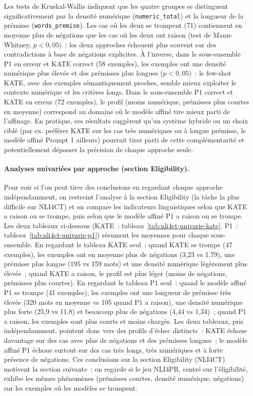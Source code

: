 \documentclass[10pt,twoside]{article}
\begin{document}
Les tests de Kruskal-Wallis indiquent que les quatre groupes se distinguent significativement par la densité numérique (\texttt{numeric\_total}) et la longueur de la prémisse (\texttt{words\_premise}). Les cas où les deux se trompent (71) contiennent en moyenne plus de négations que les cas où les deux ont raison (test de Mann-Whitney, $p < 0{,}05$)~: les deux approches échouent plus souvent sur des contradictions à base de négations explicites. À l'inverse, dans le sous-ensemble P1 en erreur et KATE correct (58 exemples), les exemples ont une densité numérique plus élevée et des prémisses plus longues ($p < 0{,}05$)~: le few-shot KATE, avec des exemples sémantiquement proches, semble mieux exploiter le contexte numérique et les critères longs. Dans le sous-ensemble P1 correct et KATE en erreur (72 exemples), le profil (moins numérique, prémisses plus courtes en moyenne) correspond au domaine où le modèle affiné tire mieux parti de l'affinage. En pratique, ces résultats suggèrent qu'un système hybride ou un choix ciblé (par ex. préférer KATE sur les cas très numériques ou à longue prémisse, le modèle affiné Prompt 1 ailleurs) pourrait tirer parti de cette complémentarité et potentiellement dépasser la précision de chaque approche seule.

\paragraph{Analyses univariées par approche (section Eligibility).}
Pour voir si l'on peut tirer des conclusions en regardant chaque approche indépendamment, on restreint l'analyse à la section Eligibility (la tâche la plus difficile sur NLI4CT) et on compare les indicateurs linguistiques selon que KATE a raison ou se trompe, puis selon que le modèle affiné P1 a raison ou se trompe. Les deux tableaux ci-dessous (KATE~: tableau~\ref{tab:nli4ct-univarie-kate}, P1~: tableau~\ref{tab:nli4ct-univarie-p1}) résument les moyennes pour chaque sous-ensemble. En regardant le tableau KATE seul~: quand KATE se trompe (47 exemples), les exemples ont en moyenne plus de négations (3,23 vs 1,79), une prémisse plus longue (195 vs 159 mots) et une densité numérique légèrement plus élevée~; quand KATE a raison, le profil est plus léger (moins de négations, prémisses plus courtes). En regardant le tableau P1 seul~: quand le modèle affiné P1 se trompe (41 exemples), les exemples ont une longueur de prémisse très élevée (320 mots en moyenne vs 105 quand P1 a raison), une densité numérique plus forte (25,9 vs 11,8) et beaucoup plus de négations (4,44 vs 1,34)~; quand P1 a raison, les exemples sont plus courts et moins chargés. Les deux tableaux, pris indépendamment, pointent donc vers des profils d'échec distincts~: KATE échoue davantage sur des cas avec plus de négations et des prémisses longues~; le modèle affiné P1 échoue surtout sur des cas très longs, très numériques et à forte présence de négations. Ces conclusions sur la section Eligibility (NLI4CT) motivent la section suivante~: on regarde si le jeu NLI4PR, centré sur l'éligibilité, exhibe les mêmes phénomènes (prémisses courtes, densité numérique, négations) sur les exemples où les modèles se trompent.
\end{document}
